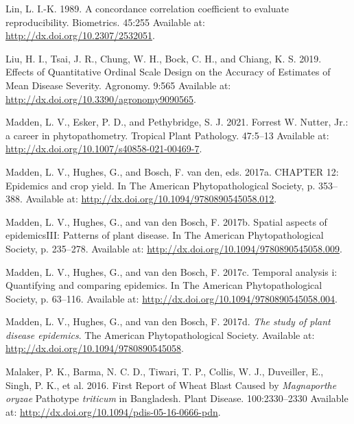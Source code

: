 \documentclass[
  letterpaper,
  DIV=11,
  numbers=noendperiod]{scrreprt}
\newlength{\cslhangindent}
\newlength{\cslentryspacingunit} %
\newenvironment{CSLReferences}[2] %
 {%
  \setlength{\parindent}{0pt}
  \ifodd #1
  \let\oldpar\par
  \def\par{\hangindent=\cslhangindent\oldpar}
  \fi
  \setlength{\parskip}{#2\cslentryspacingunit}
 }%
 {}
\begin{document}
\begin{CSLReferences}{0}{0}
\leavevmode{}%
Lin, L. I.-K. 1989. A concordance correlation coefficient to evaluate
reproducibility. Biometrics. 45:255 Available at:
\url{http://dx.doi.org/10.2307/2532051}.

\leavevmode{}%
Liu, H. I., Tsai, J. R., Chung, W. H., Bock, C. H., and Chiang, K. S.
2019. Effects of Quantitative Ordinal Scale Design on the Accuracy of
Estimates of Mean Disease Severity. Agronomy. 9:565 Available at:
\url{http://dx.doi.org/10.3390/agronomy9090565}.

\leavevmode{}%
Madden, L. V., Esker, P. D., and Pethybridge, S. J. 2021. Forrest W.
Nutter, Jr.: a career in phytopathometry. Tropical Plant Pathology.
47:5--13 Available at:
\url{http://dx.doi.org/10.1007/s40858-021-00469-7}.

\leavevmode{}%
Madden, L. V., Hughes, G., and Bosch, F. van den, eds. 2017a. CHAPTER
12: Epidemics and crop yield. In The American Phytopathological Society,
p. 353--388. Available at:
\url{http://dx.doi.org/10.1094/9780890545058.012}.

\leavevmode{}%
Madden, L. V., Hughes, G., and van den Bosch, F. 2017b. Spatial aspects
of epidemics{\textemdash}III: Patterns of plant disease. In The American
Phytopathological Society, p. 235--278. Available at:
\url{http://dx.doi.org/10.1094/9780890545058.009}.

\leavevmode{}%
Madden, L. V., Hughes, G., and van den Bosch, F. 2017c. Temporal
analysis i: Quantifying and comparing epidemics. In The American
Phytopathological Society, p. 63--116. Available at:
\url{http://dx.doi.org/10.1094/9780890545058.004}.

\leavevmode{}%
Madden, L. V., Hughes, G., and van den Bosch, F. 2017d. \emph{The study
of plant disease epidemics}. The American Phytopathological Society.
Available at: \url{http://dx.doi.org/10.1094/9780890545058}.

\leavevmode{}%
Malaker, P. K., Barma, N. C. D., Tiwari, T. P., Collis, W. J.,
Duveiller, E., Singh, P. K., et al. 2016. First Report of Wheat Blast
Caused by {\emph{Magnaporthe oryzae}} Pathotype {\emph{triticum}} in
Bangladesh. Plant Disease. 100:2330--2330 Available at:
\url{http://dx.doi.org/10.1094/pdis-05-16-0666-pdn}.


\end{CSLReferences}
\end{document}
